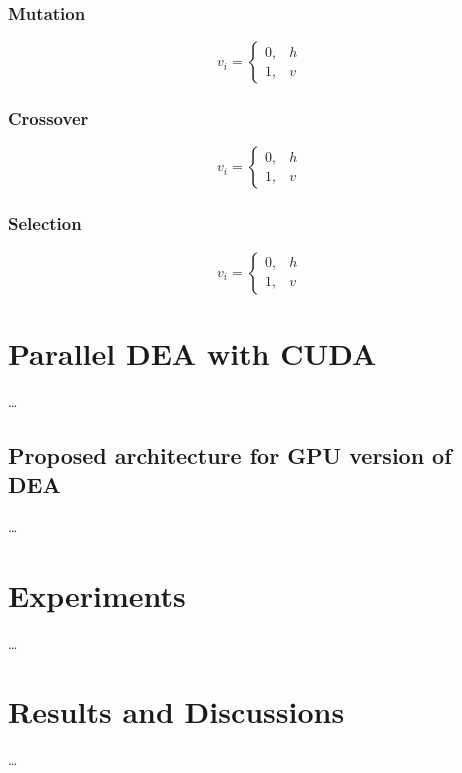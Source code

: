\documentclass[conference]{IEEEtran}
\begin{document}
\subsubsection{Mutation}

\begin{equation}
	v_i = 
	\begin{cases}
		0, &h \\
		1, &v
	\end{cases}
	\label{Mutation operation}
\end{equation}

\subsubsection{Crossover}

\begin{equation}
	v_i = 
	\begin{cases}
		0, &h \\
		1, &v
	\end{cases}
	\label{Crossover operation}
\end{equation}

\subsubsection{Selection}

\begin{equation}
	v_i = 
	\begin{cases}
		0, &h \\
		1, &v
	\end{cases}
	\label{Selection operation}
\end{equation}

\section{Parallel DEA with CUDA}
\dots

\subsection{Proposed architecture for GPU version of DEA}
\dots

\section{Experiments}
\dots

\section{Results and Discussions}
\dots
\end{document}
